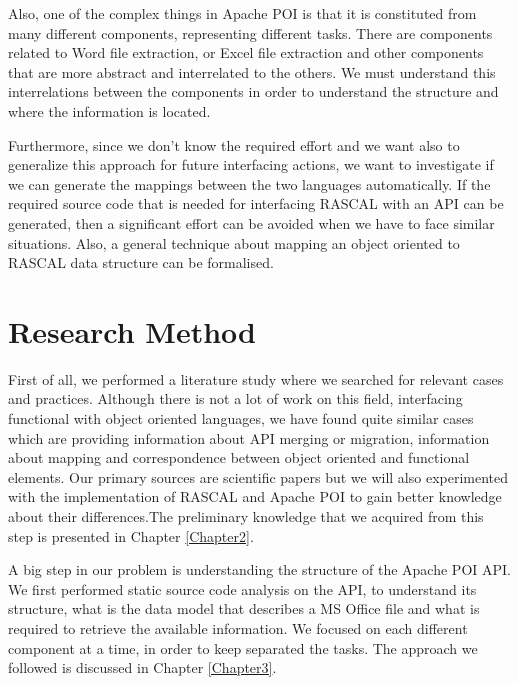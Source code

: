 Also, one of the complex things in Apache POI is that it is constituted from many different components, representing different tasks. There are components related to Word file extraction, or Excel file extraction and other components that are more abstract and interrelated to the others. We must understand this interrelations between the components in order to understand the structure and where the information is located.

Furthermore, since we don't know the required effort and we want also to generalize this approach for future interfacing actions, we want to investigate if we can generate the mappings between the two languages automatically. If the required source code that is needed for interfacing RASCAL with an API can be generated, then a significant effort can be avoided when we have to face similar situations. Also, a general technique about mapping an object oriented to RASCAL data structure can be formalised.



\section{Research Method}
First of all, we performed a literature study where we searched for relevant cases and practices. Although there is not a lot of work on this field, interfacing functional with object oriented languages, we have found quite similar cases which are providing information about API merging or migration, information about mapping and correspondence between object oriented and functional elements. Our primary sources are scientific papers but we will also experimented with the implementation of RASCAL and Apache POI to gain better knowledge about their differences.The preliminary knowledge that we acquired from this step is presented in Chapter \ref{Chapter2}.

A big step in our problem is understanding the structure of the Apache POI API. We first performed static source code analysis on the API, to understand its structure, what is the data model that describes a MS Office file and what is required to retrieve the available information. We focused on each different component at a time, in order to keep separated the tasks. The approach we followed is discussed in Chapter \ref{Chapter3}.  

